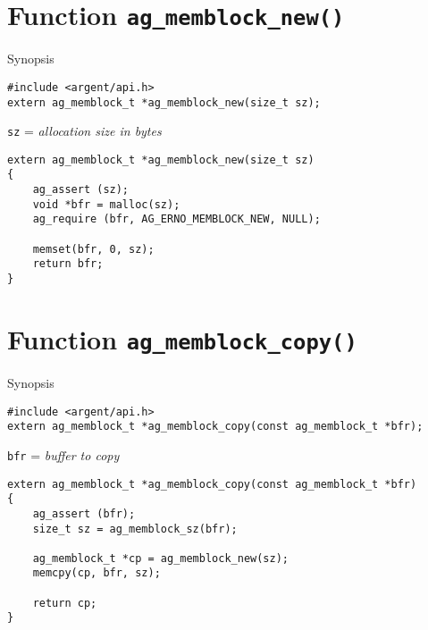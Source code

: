%

\section{Function \texttt{ag\_memblock\_new()}}
  \begin{bclogo}[logo=\bccrayon, noborder=true, barre=snake, couleurBarre=gray]
    {Synopsis}
  \lstset{style=SYNOPSIS}
  \begin{lstlisting}[linewidth=1.0\linewidth]
#include <argent/api.h>
extern ag_memblock_t *ag_memblock_new(size_t sz);
  \end{lstlisting}
  \scriptsize
  \texttt{sz} = \emph{allocation size in bytes}
  \end{bclogo}

\lstset{style=CODE}
\begin{lstlisting}[linewidth=1.0\linewidth,
    caption=Definition of ag\_memblock\_new()]
extern ag_memblock_t *ag_memblock_new(size_t sz)
{
    ag_assert (sz);
    void *bfr = malloc(sz);
    ag_require (bfr, AG_ERNO_MEMBLOCK_NEW, NULL);

    memset(bfr, 0, sz);
    return bfr;
}
\end{lstlisting}


%


\section{Function \texttt{ag\_memblock\_copy()}}
  \begin{bclogo}[logo=\bccrayon, noborder=true, barre=snake, couleurBarre=gray]
    {Synopsis}
  \lstset{style=SYNOPSIS}
  \begin{lstlisting}[linewidth=1.0\linewidth]
#include <argent/api.h>
extern ag_memblock_t *ag_memblock_copy(const ag_memblock_t *bfr);
  \end{lstlisting}
  \scriptsize
  \texttt{bfr} = \emph{buffer to copy}
  \end{bclogo}

\lstset{style=CODE}
\begin{lstlisting}[linewidth=1.0\linewidth,
    caption=Definition of ag\_memblock\_copy()]
extern ag_memblock_t *ag_memblock_copy(const ag_memblock_t *bfr)
{
    ag_assert (bfr);
    size_t sz = ag_memblock_sz(bfr);

    ag_memblock_t *cp = ag_memblock_new(sz);
    memcpy(cp, bfr, sz);

    return cp;
}
\end{lstlisting}


